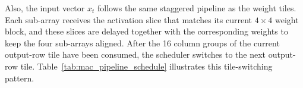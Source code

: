 \documentclass[11pt,twoside]{eitExjobb}
\begin{document}
\begin{table}[H]
\centering
\setlength{\abovecaptionskip}{2pt}
\setlength{\belowcaptionskip}{0pt}
\begin{minipage}[t]{0.47\linewidth}
\centering
{}
\label{tab:col_progress}
\small
\setlength{\tabcolsep}{4pt}
\end{minipage}
\hfill
\begin{minipage}[t]{0.50\linewidth}
\centering
{}
\label{tab:col_spacing}
\small
\setlength{\tabcolsep}{4pt}
\renewcommand{\arraystretch}{1.12}
\end{minipage}
\end{table}

Also, the input vector $x_t$ follows the same staggered
pipeline as the weight tiles. Each sub-array receives the activation slice that
matches its current $4\times4$ weight block, and these slices are delayed together
with the corresponding weights to keep the four sub-arrays aligned. After the 16
column groups of the current output-row tile have been consumed, the scheduler
switches to the next output-row tile. Table~\ref{tab:mac_pipeline_schedule}
illustrates this tile-switching pattern.
\end{document}
